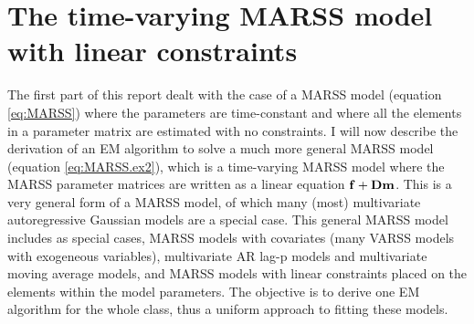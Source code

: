 \documentclass[]{article}
\def\DD{\mbox{$\mathbf D$}}	\def\dd{\mbox{$\mathbf d$}}
\begin{document}
\section{The time-varying MARSS model with linear constraints}\label{sec:tvMARSS}
The first part of this report dealt with the case of a MARSS model (equation \ref{eq:MARSS}) where the parameters are time-constant and where all the elements in a parameter matrix are estimated with no constraints.   I will now describe the derivation of an EM algorithm to solve a much more general MARSS model (equation \ref{eq:MARSS.ex2}), which is a time-varying MARSS model where the MARSS parameter matrices are written as a linear equation $\ff+\DD\mm$.  This is a very general form of a MARSS model, of which many (most) multivariate autoregressive Gaussian models are a special case.  This general MARSS model includes as special cases, MARSS models with covariates (many VARSS models with exogeneous variables), multivariate AR lag-p models and multivariate moving average models, and MARSS models with linear constraints placed on the elements within the model parameters.  The objective is to derive one EM algorithm for the whole class, thus a uniform approach to fitting these models. 
\end{document}
